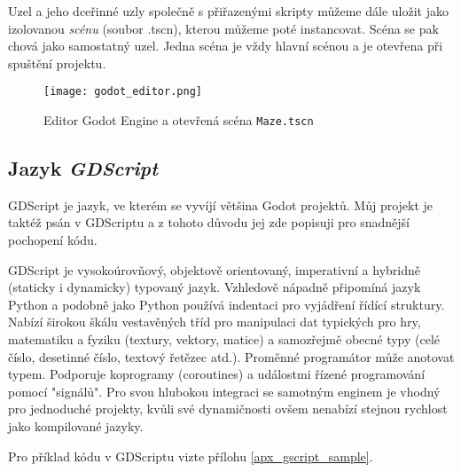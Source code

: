 Uzel a jeho dceřinné uzly společně s přiřazenými skripty můžeme dále uložit jako izolovanou \textit{scénu} (soubor .tscn), kterou můžeme poté instancovat. Scéna se pak chová jako samostatný uzel. Jedna scéna je vždy hlavní scénou a je otevřena při spuštění projektu.

\begin{figure}[H]
  \centering
  \texttt{[image: godot\_editor.png]}
  \caption{Editor Godot Engine a otevřená scéna \texttt{Maze.tscn}}
  \label{godot_editor_maze_tscn}
\end{figure}

\subsection{Jazyk \textit{GDScript}}

GDScript je jazyk, ve kterém se vyvíjí většina Godot projektů. Můj projekt je taktéž psán v GDScriptu a z tohoto důvodu jej zde popisuji pro snadnější pochopení kódu.

GDScript je vysokoúrovňový, objektově orientovaný, imperativní a hybridně (staticky i dynamicky) typovaný jazyk. Vzhledově nápadně připomíná jazyk Python a podobně jako Python používá indentaci pro vyjádření řídící struktury. Nabízí širokou škálu vestavěných tříd pro manipulaci dat typických pro hry, matematiku a fyziku (textury, vektory, matice) a samozřejmě obecné typy (celé číslo, desetinné číslo, textový řetězec atd.). Proměnné programátor může anotovat typem. Podporuje koprogramy (coroutines) a událostmi řízené programování pomocí "signálů". Pro svou hlubokou integraci se samotným enginem je vhodný pro jednoduché projekty, kvůli své dynamičnosti ovšem nenabízí stejnou rychlost jako kompilované jazyky. \cite{gdscript_reference}

Pro příklad kódu v GDScriptu vizte přílohu \ref{apx_gscript_sample}.